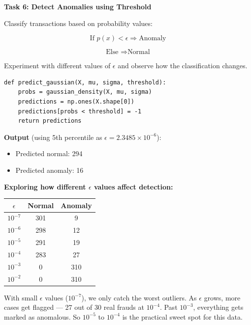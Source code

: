 \documentclass[12pt,a4paper]{article}
\begin{document}
\begin{tcolorbox}
\textbf{Task 6: Detect Anomalies using Threshold}

Classify transactions based on probability values:

\[
\text{If } p(x) < \epsilon \Rightarrow \text{Anomaly}
\]

\[
\text{Else } \Rightarrow \text{Normal}
\]

Experiment with different values of $\epsilon$ and observe how the classification changes.

\begin{lstlisting}
def predict_gaussian(X, mu, sigma, threshold):
    probs = gaussian_density(X, mu, sigma)
    predictions = np.ones(X.shape[0])
    predictions[probs < threshold] = -1
    return predictions
\end{lstlisting}

\textbf{Output} (using 5th percentile as $\epsilon = 2.3485 \times 10^{-6}$):
\begin{itemize}
\item Predicted normal: 294
\item Predicted anomaly: 16
\end{itemize}

\vspace{6pt}

\textbf{Exploring how different $\epsilon$ values affect detection:}

\begin{center}
\begin{tabular}{|c|c|c|}
\hline
\textbf{$\epsilon$} & \textbf{Normal} & \textbf{Anomaly} \\
\hline
$10^{-7}$ & 301 & 9 \\
\hline
$10^{-6}$ & 298 & 12 \\
\hline
$10^{-5}$ & 291 & 19 \\
\hline
$10^{-4}$ & 283 & 27 \\
\hline
$10^{-3}$ & 0 & 310 \\
\hline
$10^{-2}$ & 0 & 310 \\
\hline
\end{tabular}
\end{center}

With small $\epsilon$ values ($10^{-7}$), we only catch the worst outliers. As $\epsilon$ grows, more cases get flagged --- 27 out of 30 real frauds at $10^{-4}$. Past $10^{-3}$, everything gets marked as anomalous. So $10^{-5}$ to $10^{-4}$ is the practical sweet spot for this data.

\end{tcolorbox}
\end{document}
